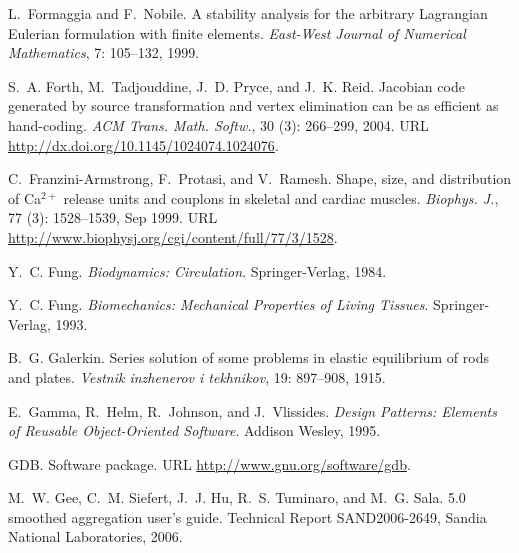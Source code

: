 \begin{thebibliography}{467}
L.~Formaggia and F.~Nobile.
\newblock A stability analysis for the arbitrary {L}agrangian {E}ulerian
  formulation with finite elements.
\newblock \emph{East-West Journal of Numerical Mathematics}, 7:
  105--132, 1999.

S.~A. Forth, M.~Tadjouddine, J.~D. Pryce, and J.~K. Reid.
\newblock Jacobian code generated by source transformation and vertex
  elimination can be as efficient as hand-coding.
\newblock \emph{ACM Trans. Math. Softw.}, 30 (3): 266--299,
  2004.
\newblock URL \url{http://dx.doi.org/10.1145/1024074.1024076}.

C.~Franzini-Armstrong, F.~Protasi, and V.~Ramesh.
\newblock Shape, size, and distribution of {C}a$^{2+}$ release units and
  couplons in skeletal and cardiac muscles.
\newblock \emph{Biophys. J.}, 77 (3): 1528--1539, Sep 1999.
\newblock URL \url{http://www.biophysj.org/cgi/content/full/77/3/1528}.

Y.~C. Fung.
\newblock \emph{Biodynamics: Circulation}.
\newblock Springer-Verlag, 1984.

Y.~C. Fung.
\newblock \emph{Biomechanics: Mechanical Properties of Living Tissues}.
\newblock Springer-Verlag, 1993.

B.~G. Galerkin.
\newblock Series solution of some problems in elastic equilibrium of rods and
  plates.
\newblock \emph{Vestnik inzhenerov i tekhnikov}, 19: 897--908, 1915.

E.~Gamma, R.~Helm, R.~Johnson, and J.~Vlissides.
\newblock \emph{Design Patterns: Elements of Reusable Object-Oriented
  Software}.
\newblock Addison Wesley, 1995.

GDB.
\newblock Software package.
\newblock URL \url{http://www.gnu.org/software/gdb}.

M.~W. Gee, C.~M. Siefert, J.~J. Hu, R.~S. Tuminaro, and M.~G. Sala.
 5.0 smoothed aggregation user's guide.
\newblock Technical Report SAND2006-2649, Sandia National Laboratories, 2006.


\end{thebibliography}
